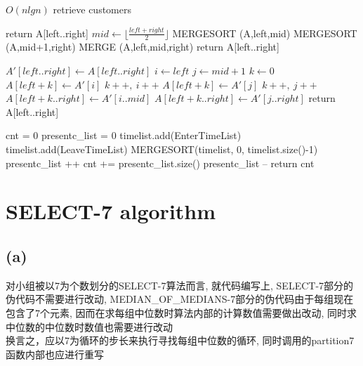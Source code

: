 \documentclass{article}
\begin{document}
\begin{algorithm}
\caption{$O(nlgn)$ retrieve customers}
\begin{algorithmic}[1]

\Comment{A是数组, left, right是下标]}
\State return A[left..right]
\EndIf
\State $mid \gets \lfloor \frac{left+right}{2} \rfloor$
\State MERGESORT (A,left,mid)
\State MERGESORT (A,mid+1,right)
\State MERGE (A,left,mid,right)
\State return A[left..right]
\EndProcedure

\Comment{A是数组, left, right是下标]}
\State $A'[left..right] \gets A[left..right] $
\State $i \gets left $
\State $j \gets mid+1 $
\State $k \gets 0 $
\State $A[left+k] \gets A'[i]$
\State $k++,\ i++$
\Else
\State $A[left+k] \gets A'[j]$
\State $k++,\ j++$
\EndIf
\EndWhile
{}
\State $A[left+k..right] \gets A'[i..mid]$
\Else
\State $A[left+k..right] \gets A'[j..right]$
\EndIf
\State return A[left..right]
\EndProcedure

\State cnt = 0
\State presentc\_list = 0
\State timelist.add(EnterTimeList)
\State timelist.add(LeaveTimeList)
\State MERGESORT(timelist, 0, timelist.size()-1)
\State presentc\_list ++
\State cnt += presentc\_list.size()
\Else{}
\State presentc\_list --
\EndIf
\EndFor
\State return cnt
\EndProcedure
\end{algorithmic}
\end{algorithm}


\section{SELECT-7 algorithm}
\subsection{(a)}
对小组被以7为个数划分的SELECT-7算法而言, 就代码编写上, SELECT-7部分的伪代码不需要进行改动, MEDIAN\_OF\_MEDIANS-7部分的伪代码由于每组现在包含了7个元素, 因而在求每组中位数时算法内部的计算数值需要做出改动, 同时求中位数的中位数时数值也需要进行改动 \\
换言之，应以7为循环的步长来执行寻找每组中位数的循环, 同时调用的partition7函数内部也应进行重写
\end{document}
